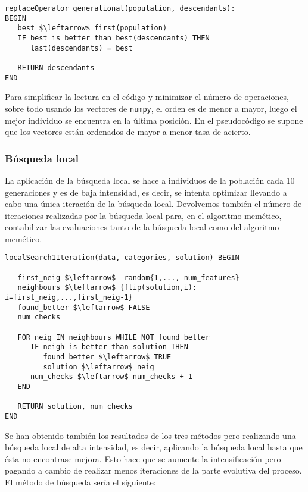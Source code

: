\documentclass[11pt,leqno]{article}
\begin{document}
\begin{lstlisting}[mathescape=true]
replaceOperator_generational(population, descendants):
BEGIN
   best $\leftarrow$ first(population)
   IF best is better than best(descendants) THEN
      last(descendants) = best
   
   RETURN descendants
END
\end{lstlisting}

Para simplificar la lectura en el código y minimizar el número de operaciones, sobre todo usando los vectores de \texttt{numpy}, el orden es de menor a mayor, luego el mejor individuo se encuentra en la última posición. En el pseudocódigo se supone que los vectores están ordenados de mayor a menor tasa de acierto.

\subsubsection{Búsqueda local}

La aplicación de la búsqueda local se hace a individuos de la población cada 10 generaciones y es de baja intensidad, es decir, se intenta optimizar llevando a cabo una única iteración de la búsqueda local. Devolvemos también el número de iteraciones realizadas por la búsqueda local para, en el algoritmo memético, contabilizar las evaluaciones tanto de la búsqueda local como del algoritmo memético.

\begin{lstlisting}[mathescape=true]
localSearch1Iteration(data, categories, solution) BEGIN	

   first_neig $\leftarrow$  random{1,..., num_features}
   neighbours $\leftarrow$ {flip(solution,i): i=first_neig,...,first_neig-1}
   found_better $\leftarrow$ FALSE
   num_checks 
		
   FOR neig IN neighbours WHILE NOT found_better
      IF neigh is better than solution THEN
         found_better $\leftarrow$ TRUE
         solution $\leftarrow$ neig
      num_checks $\leftarrow$ num_checks + 1 
   END
      
   RETURN solution, num_checks
END
	\end{lstlisting}
	
	Se han obtenido también los resultados de los tres métodos pero realizando una búsqueda local de alta intensidad, es decir, aplicando la búsqueda local hasta que ésta no encontrase mejora. Esto hace que se aumente la intensificación pero pagando a cambio de realizar menos iteraciones de la parte evolutiva del proceso. El método de búsqueda sería el siguiente:
	
\end{document}
